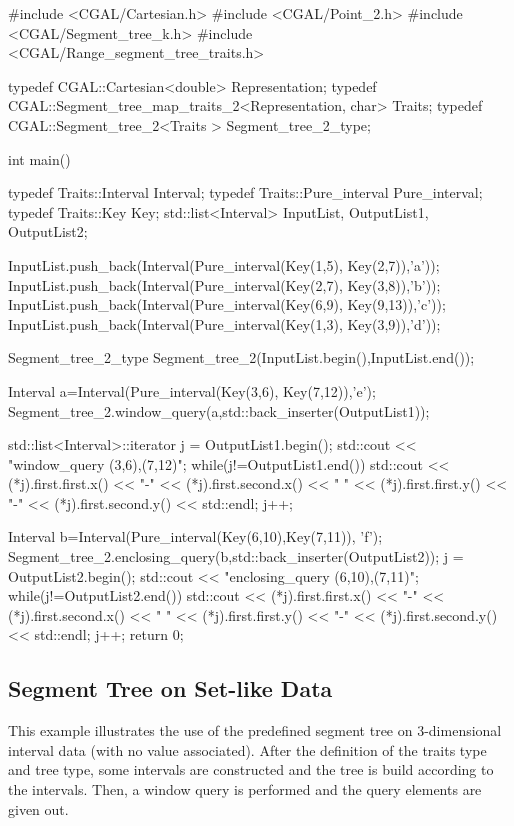 \begin{cprog}
#include <CGAL/Cartesian.h>
#include <CGAL/Point_2.h>
#include <CGAL/Segment_tree_k.h>
#include <CGAL/Range_segment_tree_traits.h>

typedef CGAL::Cartesian<double> Representation;
typedef CGAL::Segment_tree_map_traits_2<Representation, char> Traits;
typedef CGAL::Segment_tree_2<Traits > Segment_tree_2_type;

int main()
{
  typedef Traits::Interval Interval;
  typedef Traits::Pure_interval Pure_interval;
  typedef Traits::Key Key;
  std::list<Interval> InputList, OutputList1, OutputList2;

  InputList.push_back(Interval(Pure_interval(Key(1,5), Key(2,7)),'a'));
  InputList.push_back(Interval(Pure_interval(Key(2,7), Key(3,8)),'b'));
  InputList.push_back(Interval(Pure_interval(Key(6,9), Key(9,13)),'c'));
  InputList.push_back(Interval(Pure_interval(Key(1,3), Key(3,9)),'d'));
 
  Segment_tree_2_type Segment_tree_2(InputList.begin(),InputList.end());

  Interval a=Interval(Pure_interval(Key(3,6), Key(7,12)),'e');
  Segment_tree_2.window_query(a,std::back_inserter(OutputList1));

  std::list<Interval>::iterator j = OutputList1.begin();
  std::cout << "\n window_query (3,6),(7,12)\n";
  while(j!=OutputList1.end()){
    std::cout << (*j).first.first.x() << "-" << (*j).first.second.x() << " " 
         << (*j).first.first.y() << "-" << (*j).first.second.y() << std::endl; 
    j++;
  }
  
  Interval b=Interval(Pure_interval(Key(6,10),Key(7,11)), 'f');
  Segment_tree_2.enclosing_query(b,std::back_inserter(OutputList2));
  j = OutputList2.begin();
  std::cout << "\n enclosing_query (6,10),(7,11)\n";
  while(j!=OutputList2.end()){
    std::cout << (*j).first.first.x() << "-" << (*j).first.second.x() << " " 
         << (*j).first.first.y() << "-" << (*j).first.second.y() << std::endl; 
    j++;
  }
  return 0; 
}

\end{cprog}

\subsection{Segment Tree on Set-like Data}

This example illustrates the use of the predefined segment tree
on 3-dimensional interval data (with no value associated). After
the definition of the traits type and tree type, some intervals
are constructed and the tree is build according to the
intervals. Then, a window query is performed and the query
elements are given out.

